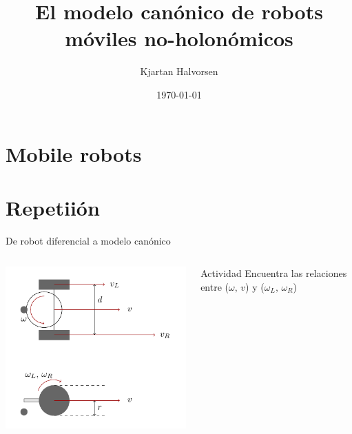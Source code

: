 \documentclass[presentation,aspectratio=169]{beamer}
\author{Kjartan Halvorsen}
\date{\today}
\title{El modelo canónico de robots móviles no-holonómicos}
\begin{document}
\maketitle

\section{Mobile robots}
\label{sec:org22ae9bb}

\section{Repetiión}
\label{sec:org33436d3}

\begin{frame}[label={sec:org9a790ed}]{De robot diferencial a modelo canónico}
\begin{columns}
\begin{column}{0.4\columnwidth}
\begin{center}
 \includegraphics[width=1.0\linewidth]{../figures/unicycle-model-details}
\end{center}
\end{column}

\begin{column}{0.6\columnwidth}
\pause

\alert{Actividad} Encuentra las relaciones entre (\(\omega,\, v\)) y (\(\omega_L, \,\omega_R\))

\pause


\end{column}
\end{columns}
\end{frame}
\end{document}
